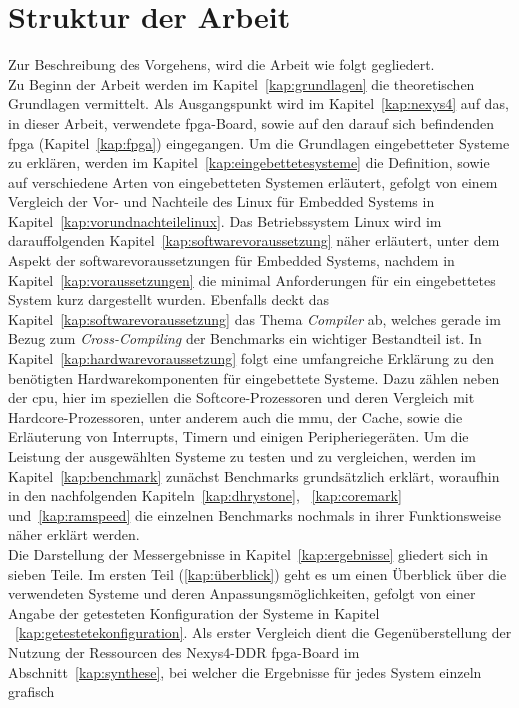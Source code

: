  \section{Struktur der Arbeit}\label{kap:strukturderarbeit}

Zur Beschreibung des Vorgehens, wird die Arbeit wie folgt gegliedert.\\
 Zu Beginn der Arbeit werden im Kapitel~\ref{kap:grundlagen} die theoretischen Grundlagen vermittelt. Als
Ausgangspunkt wird im Kapitel~\ref{kap:nexys4} auf das, in dieser Arbeit, verwendete \ac{fpga}-Board, sowie auf den darauf sich befindenden \ac{fpga} (Kapitel~\ref{kap:fpga}) eingegangen.
 Um die Grundlagen eingebetteter Systeme zu erklären, werden im Kapitel~\ref{kap:eingebettetesysteme} die Definition, sowie auf verschiedene Arten von eingebetteten Systemen erläutert, gefolgt von
 einem Vergleich der Vor- und Nachteile des Linux für Embedded Systems in Kapitel~\ref{kap:vorundnachteilelinux}. Das Betriebssystem Linux wird im darauffolgenden Kapitel~\ref{kap:softwarevoraussetzung} näher
 erläutert, unter dem Aspekt der softwarevoraussetzungen für Embedded Systems, nachdem in Kapitel~\ref{kap:voraussetzungen} die minimal Anforderungen für ein eingebettetes System kurz dargestellt wurden.
 Ebenfalls deckt das Kapitel~\ref{kap:softwarevoraussetzung} das Thema \emph{Compiler} ab, welches gerade im Bezug zum \emph{Cross-Compiling} der Benchmarks ein wichtiger Bestandteil ist.
 In Kapitel~\ref{kap:hardwarevoraussetzung} folgt eine umfangreiche Erklärung zu den benötigten Hardwarekomponenten für eingebettete Systeme. Dazu zählen neben der \ac{cpu}, hier im speziellen die
 Softcore-Prozessoren und deren Vergleich mit Hardcore-Prozessoren, unter anderem auch die \ac{mmu}, der Cache, sowie die Erläuterung von Interrupts, Timern und einigen Peripheriegeräten. Um die Leistung
 der ausgewählten Systeme zu testen und zu vergleichen, werden im Kapitel~\ref{kap:benchmark} zunächst Benchmarks grundsätzlich erklärt, woraufhin in den nachfolgenden Kapiteln~\ref{kap:dhrystone},
~\ref{kap:coremark} und~\ref{kap:ramspeed} die einzelnen Benchmarks nochmals in ihrer Funktionsweise näher erklärt werden.\\
Die Darstellung der Messergebnisse in Kapitel~\ref{kap:ergebnisse} gliedert sich in sieben Teile.
Im ersten Teil (\ref{kap:überblick}) geht es um einen Überblick über die verwendeten Systeme und deren Anpassungsmöglichkeiten, gefolgt von einer Angabe der getesteten Konfiguration der Systeme in Kapitel
~\ref{kap:getestetekonfiguration}.
Als erster Vergleich dient die Gegenüberstellung der Nutzung der Ressourcen des Nexys4-DDR \ac{fpga}-Board im Abschnitt~\ref{kap:synthese}, bei welcher die Ergebnisse für jedes System einzeln grafisch
